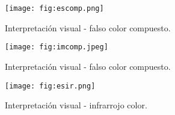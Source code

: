 \begin{frame}{}
  \begin{figure}
    \centering
    \texttt{[image: fig:escomp.png]}
    \caption{Interpretación visual - falso color compuesto.}
    \label{}
  \end{figure}
\end{frame}

\begin{frame}{}
  \begin{figure}
    \centering
    \texttt{[image: fig:imcomp.jpeg]}
    \caption{Interpretación visual - falso color compuesto.}
    \label{}
  \end{figure}
\end{frame}



\begin{frame}{}
  \begin{figure}
    \centering
    \texttt{[image: fig:esir.png]}
    \caption{Interpretación visual - infrarrojo color.}
    \label{}
  \end{figure}
\end{frame}

\gracias
